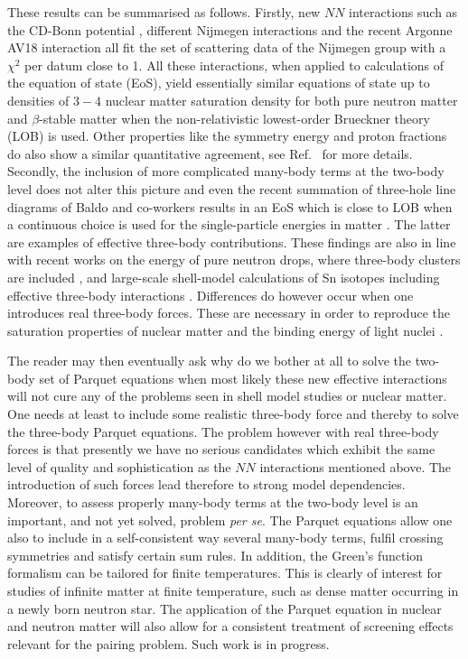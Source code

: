 These results can be summarised as follows. 
Firstly, new $NN$  interactions such as
the CD-Bonn potential \cite{Morten:cdbonn}, different Nijmegen interactions
\cite{Morten:nijmegen94} and the recent Argonne AV18 interaction
\cite{Morten:argv18}
all fit 
the set of scattering data of the 
Nijmegen group 
with a $\chi^2$ per datum close to 1. All these interactions,
when applied to calculations of the equation of state (EoS),
yield essentially similar equations of state up to
densities of $3-4$ nuclear matter saturation density  
for both pure neutron matter
and $\beta$-stable matter when 
the non-relativistic lowest-order Brueckner theory (LOB) is used. 
Other properties like the 
symmetry energy and proton fractions do also show
a similar quantitative agreement, see Ref.~ for more
details.
Secondly, the inclusion of more complicated 
many-body terms at the two-body \cite{Morten:apr98}
level does not alter this picture and even the recent 
summation of three-hole line diagrams of Baldo and co-workers
\cite{Morten:baldo98} results in an EoS which is  
close to LOB when a continuous
choice is used for the single-particle energies in matter
\cite{Morten:baldo98}. The latter are examples of effective
three-body contributions. These findings 
are also in line with
recent works on the energy of pure neutron 
drops, where three-body clusters are included \cite{Morten:ndrops97},
and large-scale shell-model calculations of Sn 
isotopes including 
effective three-body interactions \cite{Morten:eho99}.
Differences do however occur 
when one introduces real three-body forces.
These are necessary
in order to reproduce the saturation properties of nuclear matter
\cite{Morten:apr98} and the binding energy of light nuclei \cite{Morten:vijay}.


The reader may then eventually ask why do we bother at all to solve
the two-body set of Parquet equations when most likely these new
effective interactions will not cure any of the problems
seen in shell model studies or nuclear matter. One needs at least to
include some realistic three-body force and thereby to solve
the three-body Parquet equations. 
The problem however with real three-body forces is that presently
we have no serious candidates which exhibit the same level
of quality and sophistication 
as the $NN$  interactions mentioned above.
The introduction of such forces lead therefore to strong model
dependencies. Moreover, to assess properly many-body terms at the two-body
level is an important, and not yet solved, problem \emph{per se}.
The Parquet equations allow one also to include in a self-consistent way
several many-body terms, fulfil crossing symmetries and
satisfy certain sum rules. In addition, the Green's function formalism
can be tailored for finite temperatures. 
This is clearly of interest for studies of infinite matter at finite
temperature, such as dense matter occurring in a newly born
neutron star. 
The application of the Parquet equation in nuclear and neutron matter will also
allow for a consistent treatment of screening effects relevant for
the pairing problem. Such work is in progress.  


